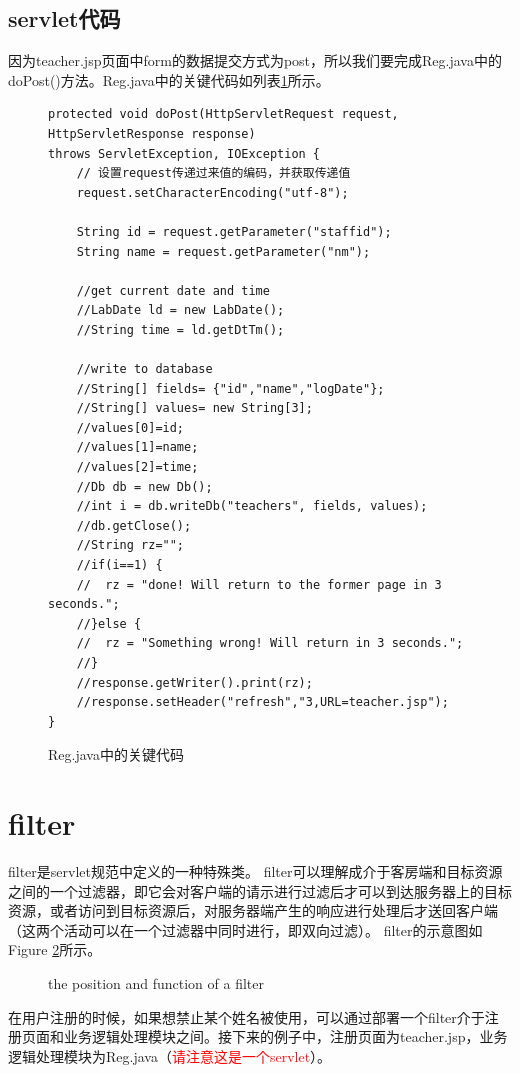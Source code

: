 \subsection{servlet代码}
因为teacher.jsp页面中form的数据提交方式为post，所以我们要完成Reg.java中的doPost()方法。Reg.java中的关键代码如列表\ref{reg}所示。
\begin{figure}
\begin{lstlisting}
protected void doPost(HttpServletRequest request, HttpServletResponse response) 
throws ServletException, IOException {
	// 设置request传递过来值的编码，并获取传递值
	request.setCharacterEncoding("utf-8");
	
	String id = request.getParameter("staffid");
	String name = request.getParameter("nm");
	
	//get current date and time
	//LabDate ld = new LabDate();
	//String time = ld.getDtTm();
	
	//write to database
	//String[] fields= {"id","name","logDate"};
	//String[] values= new String[3];
	//values[0]=id;
	//values[1]=name;
	//values[2]=time;
	//Db db = new Db();
	//int i = db.writeDb("teachers", fields, values);
	//db.getClose();
	//String rz="";
	//if(i==1) {
	//	rz = "done! Will return to the former page in 3 seconds.";
	//}else {
	//	rz = "Something wrong! Will return in 3 seconds.";
	//}
	//response.getWriter().print(rz);
	//response.setHeader("refresh","3,URL=teacher.jsp");
}
\end{lstlisting}
\caption{Reg.java中的关键代码}
\label{reg}
\end{figure}

\section{filter}
filter是servlet规范中定义的一种特殊类。
filter可以理解成介于客房端和目标资源之间的一个过滤器，即它会对客户端的请示进行过滤后才可以到达服务器上的目标资源，或者访问到目标资源后，对服务器端产生的响应进行处理后才送回客户端（这两个活动可以在一个过滤器中同时进行，即双向过滤）。
filter的示意图如Figure \ref{filter}所示。
\begin{figure}
\caption{the position and function of a filter}
\label{filter}
\end{figure}
在用户注册的时候，如果想禁止某个姓名被使用，可以通过部署一个filter介于注册页面和业务逻辑处理模块之间。接下来的例子中，注册页面为teacher.jsp，业务逻辑处理模块为Reg.java（\textcolor{red}{请注意这是一个servlet}）。

